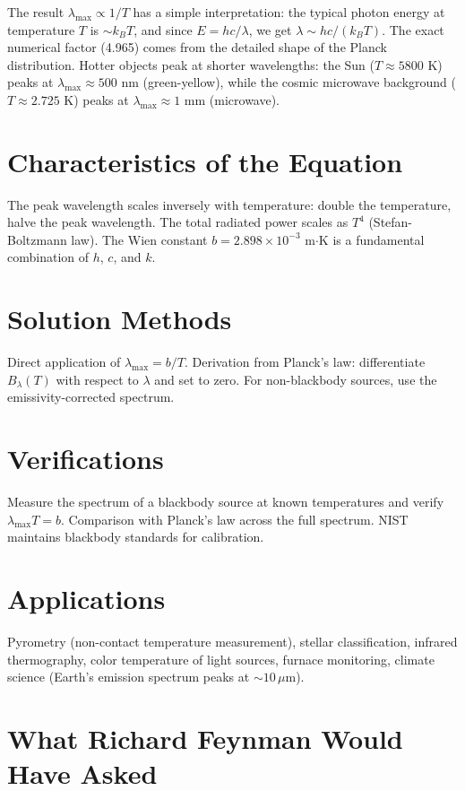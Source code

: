 The result $\lambda_{\max} \propto 1/T$ has a simple interpretation: the typical photon energy at temperature $T$ is $\sim k_B T$, and since $E = hc/\lambda$, we get $\lambda \sim hc/(k_B T)$. The exact numerical factor (4.965) comes from the detailed shape of the Planck distribution. Hotter objects peak at shorter wavelengths: the Sun ($T \approx 5800$ K) peaks at $\lambda_{\max} \approx 500$ nm (green-yellow), while the cosmic microwave background ($T \approx 2.725$ K) peaks at $\lambda_{\max} \approx 1$ mm (microwave).

\section*{Characteristics of the Equation}

The peak wavelength scales inversely with temperature: double the temperature, halve the peak wavelength. The total radiated power scales as $T^4$ (Stefan-Boltzmann law). The Wien constant $b = 2.898 \times 10^{-3}$ m$\cdot$K is a fundamental combination of $h$, $c$, and $k$.
\section*{Solution Methods}

Direct application of $\lambda_{\max} = b/T$. Derivation from Planck's law: differentiate $B_\lambda(T)$ with respect to $\lambda$ and set to zero. For non-blackbody sources, use the emissivity-corrected spectrum.
\section*{Verifications}

Measure the spectrum of a blackbody source at known temperatures and verify $\lambda_{\max} T = b$. Comparison with Planck's law across the full spectrum. NIST maintains blackbody standards for calibration.
\section*{Applications}

Pyrometry (non-contact temperature measurement), stellar classification, infrared thermography, color temperature of light sources, furnace monitoring, climate science (Earth's emission spectrum peaks at $\sim 10\,\mu$m).
\section*{What Richard Feynman Would Have Asked}

